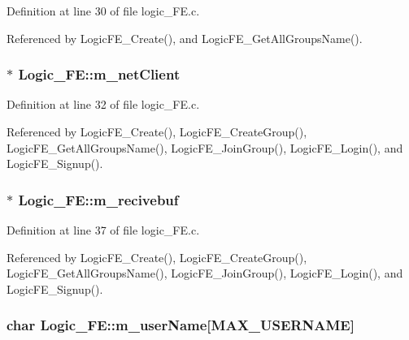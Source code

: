 Definition at line 30 of file logic\+\_\+\+F\+E.\+c.



Referenced by Logic\+F\+E\+\_\+\+Create(), and Logic\+F\+E\+\_\+\+Get\+All\+Groups\+Name().

\subsubsection[{\texorpdfstring{m\+\_\+net\+Client}{m_netClient}}]{$\ast$ Logic\+\_\+\+F\+E\+::m\+\_\+net\+Client}\hypertarget{structLogic__FE_a06cbcf2558d20e6d419e25b0f59f4b9a}{}\label{structLogic__FE_a06cbcf2558d20e6d419e25b0f59f4b9a}


Definition at line 32 of file logic\+\_\+\+F\+E.\+c.



Referenced by Logic\+F\+E\+\_\+\+Create(), Logic\+F\+E\+\_\+\+Create\+Group(), Logic\+F\+E\+\_\+\+Get\+All\+Groups\+Name(), Logic\+F\+E\+\_\+\+Join\+Group(), Logic\+F\+E\+\_\+\+Login(), and Logic\+F\+E\+\_\+\+Signup().

\subsubsection[{\texorpdfstring{m\+\_\+recivebuf}{m_recivebuf}}]{$\ast$ Logic\+\_\+\+F\+E\+::m\+\_\+recivebuf}\hypertarget{structLogic__FE_ad5c78d6067e74dd81af08e3f4226556f}{}\label{structLogic__FE_ad5c78d6067e74dd81af08e3f4226556f}


Definition at line 37 of file logic\+\_\+\+F\+E.\+c.



Referenced by Logic\+F\+E\+\_\+\+Create(), Logic\+F\+E\+\_\+\+Create\+Group(), Logic\+F\+E\+\_\+\+Get\+All\+Groups\+Name(), Logic\+F\+E\+\_\+\+Join\+Group(), Logic\+F\+E\+\_\+\+Login(), and Logic\+F\+E\+\_\+\+Signup().

\subsubsection[{\texorpdfstring{m\+\_\+user\+Name}{m_userName}}]{\setlength{\rightskip}{0pt plus 5cm}char Logic\+\_\+\+F\+E\+::m\+\_\+user\+Name\mbox{[}{\bf M\+A\+X\+\_\+\+U\+S\+E\+R\+N\+A\+ME}\mbox{]}}\hypertarget{structLogic__FE_afc81e6f40bbe8553a56a6e890ace96c4}{}\label{structLogic__FE_afc81e6f40bbe8553a56a6e890ace96c4}


